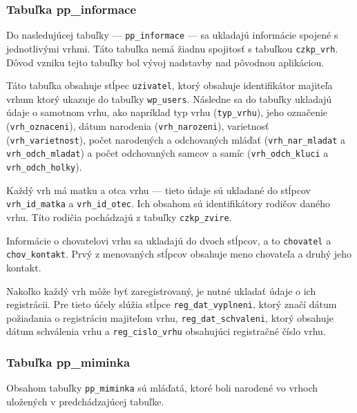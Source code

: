 \subsubsection*{Tabuľka pp\_informace}

Do nasledujúcej tabuľky --- \texttt{pp_informace} --- sa ukladajú informácie spojené s jednotlivými vrhmi. Táto tabuľka nemá žiadnu spojitosť s tabuľkou \texttt{czkp_vrh}. Dôvod vzniku tejto tabuľky bol vývoj nadstavby nad pôvodnou aplikáciou.

Táto tabuľka obsahuje stĺpec \texttt{uzivatel}, ktorý obsahuje identifikátor majiteľa vrhum ktorý ukazuje do tabuľky \texttt{wp_users}. Následne sa do tabuľky ukladajú údaje o samotnom vrhu, ako napríklad typ vrhu (\texttt{typ_vrhu}), jeho označenie (\texttt{vrh_oznaceni}), dátum narodenia (\texttt{vrh_narozeni}), varietnosť \\(\texttt{vrh_varietnost}), počet narodených a odchovaných mláďať (\texttt{vrh_nar_mladat} a \texttt{vrh_odch_mladat}) a počet odchovaných samcov a samíc (\texttt{vrh_odch_kluci} a \texttt{vrh_odch_holky}).

Každý vrh má matku a otca vrhu --- tieto údaje sú ukladané do stĺpcov \texttt{vrh_id_matka} a \texttt{vrh_id_otec}. Ich obsahom sú identifikátory rodičov daného vrhu. Títo rodičia pochádzajú z tabuľky \texttt{czkp_zvire}.

Informácie o chovatelovi vrhu sa ukladajú do dvoch stĺpcov, a to \texttt{chovatel} a \texttt{chov_kontakt}. Prvý z menovaných stĺpcov obsahuje meno chovateľa a druhý jeho kontakt.

Nakoľko každý vrh môže byť zaregistrovaný, je nutné ukladať údaje o ich registrácii. Pre tieto účely slúžia stĺpce  \texttt{reg_dat_vyplneni}, ktorý značí dátum požiadania o registráciu majiteľom vrhu, \texttt{reg_dat_schvaleni}, ktorý obsahuje dátum schválenia vrhu a \texttt{reg_cislo_vrhu} obsahujúci registračné číslo vrhu.

\subsubsection*{Tabuľka pp\_miminka}

Obsahom tabuľky \texttt{pp_miminka} sú mláďatá, ktoré boli narodené vo vrhoch uložených v predchádzajúcej tabuľke.

